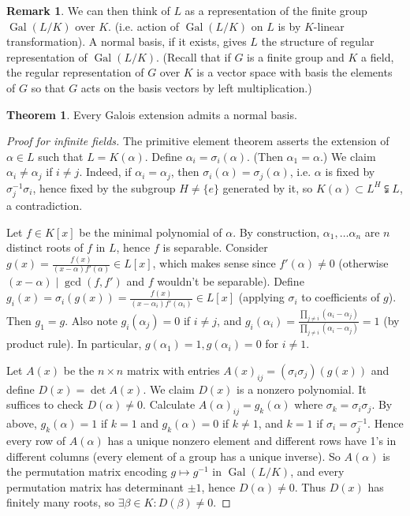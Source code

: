 \documentclass{article}
\newcommand{\Gal}{\operatorname{Gal}}
\theoremstyle{definition}
\newtheorem{thm}[defn]{Theorem}
\newtheorem{remark}[defn]{Remark}
\begin{document}
\begin{remark}
We can then think of $L$ as a representation of the finite group $\Gal(L/K)$ over $K$. (i.e. action of $\Gal(L/K)$ on $L$ is by $K$-linear transformation). A normal basis, if it exists, gives $L$ the structure of regular representation of $\Gal(L/K)$. (Recall that if $G$ is a finite group and $K$ a field, the regular representation of $G$ over $K$ is a vector space with basis the elements of $G$ so that $G$ acts on the basis vectors by left multiplication.)
\end{remark}

\begin{thm}
Every Galois extension admits a normal basis.
\end{thm}
\begin{proof}[Proof for infinite fields]
The primitive element theorem asserts the extension of $\alpha\in L$ such that $L=K(\alpha)$. Define $\alpha_i=\sigma_i(\alpha)$. (Then $\alpha_1=\alpha$.) We claim $\alpha_i\neq\alpha_j$ if $i\neq j$. Indeed, if $\alpha_i=\alpha_j$, then $\sigma_i(\alpha)=\sigma_j(\alpha)$, i.e. $\alpha$ is fixed by $\sigma_j^{-1}\sigma_i$, hence fixed by the subgroup $H\neq\{e\}$ generated by it, so $K(\alpha)\subset L^H\subsetneqq L$, a contradiction.

Let $f\in K[x]$ be the minimal polynomial of $\alpha$. By construction, $\alpha_1,\ldots\alpha_n$ are $n$ distinct roots of $f$ in $L$, hence $f$ is separable. Consider $g(x)=\frac{f(x)}{(x-\alpha)f'(\alpha)}\in L[x]$, which makes sense since $f'(\alpha)\neq 0$ (otherwise $(x-\alpha)\mid \gcd(f,f')$ and $f$ wouldn't be separable). Define $g_i(x)=\sigma_i(g(x))=\frac{f(x)}{(x-\alpha_i)f'(\alpha_i)}\in L[x]$ (applying $\sigma_i$ to coefficients of $g$). Then $g_1=g$. Also note $g_i(\alpha_j)=0$ if $i\neq j$, and $g_i(\alpha_i)=\frac{\prod_{j\neq i}(\alpha_i-\alpha_j)}{\prod_{j\neq i}(\alpha_i-\alpha_j)}=1$ (by product rule). In particular, $g(\alpha_1)=1,g(\alpha_i)=0$ for $i\neq 1$.

Let $A(x)$ be the $n\times n$ matrix with entries $A(x)_{ij}=(\sigma_i\sigma_j)(g(x))$ and define $D(x)=\det A(x)$. We claim $D(x)$ is a nonzero polynomial. It suffices to check $D(\alpha)\neq 0$. Calculate $A(\alpha)_{ij}=g_k(\alpha)$ where $\sigma_k=\sigma_i\sigma_j$. By above, $g_k(\alpha)=1$ if $k=1$ and $g_k(\alpha)=0$ if $k\neq 1$, and $k=1$ if $\sigma_i=\sigma_j^{-1}$. Hence every row of $A(\alpha)$ has a unique nonzero element and different rows have 1's in different columns (every element of a group has a unique inverse). So $A(\alpha)$ is the permutation matrix encoding $g\mapsto g^{-1}$ in $\Gal(L/K)$, and every permutation matrix has determinant $\pm 1$, hence $D(\alpha)\neq 0$. Thus $D(x)$ has finitely many roots, so $\exists\beta\in K:D(\beta)\neq 0$.


\end{proof}
\end{document}
